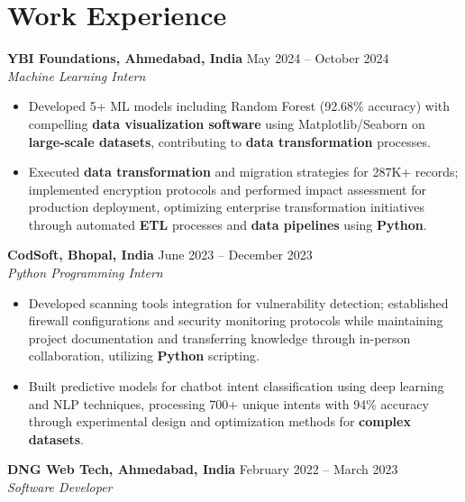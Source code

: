 \documentclass[a4paper,10pt]{article}
\begin{document}
\section*{Work Experience}
\textbf{YBI Foundations, Ahmedabad, India} \hfill May 2024 -- October 2024\\
\textit{Machine Learning Intern} \\
\begin{itemize}[leftmargin=*, itemsep=0pt, parsep=1pt]
\vspace{-6mm}
\item Developed 5+ ML models including Random Forest (92.68\% accuracy) with compelling \textbf{data visualization software} using Matplotlib/Seaborn on \textbf{large-scale datasets}, contributing to \textbf{data transformation} processes.
\item Executed \textbf{data transformation} and migration strategies for 287K+ records; implemented encryption protocols and performed impact assessment for production deployment, optimizing enterprise transformation initiatives through automated \textbf{ETL} processes and \textbf{data pipelines} using \textbf{Python}.
\end{itemize}
\textbf{CodSoft, Bhopal, India} \hfill June 2023 -- December 2023\\
\textit{Python Programming Intern} \\
\begin{itemize}[leftmargin=*, itemsep=0pt, parsep=1pt]
\vspace{-6mm}
\item Developed scanning tools integration for vulnerability detection; established firewall configurations and security monitoring protocols while maintaining project documentation and transferring knowledge through in-person collaboration, utilizing \textbf{Python} scripting.
\item Built predictive models for chatbot intent classification using deep learning and NLP techniques, processing 700+ unique intents with 94\% accuracy through experimental design and optimization methods for \textbf{complex datasets}.
\vspace{-1mm}
\end{itemize}

\textbf{DNG Web Tech, Ahmedabad, India} \hfill February 2022 -- March 2023 \\
\textit{Software Developer} \\
\end{document}

